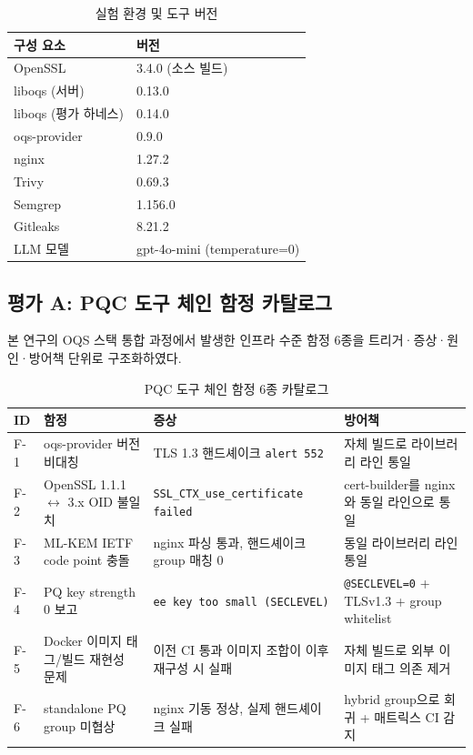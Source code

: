 \begin{table}[htbp]
\centering
\renewcommand{\arraystretch}{1.3}
\caption{실험 환경 및 도구 버전}
\label{tab:env}
\begin{tabular}{ll}
\toprule
구성 요소 & 버전 \\
\midrule
OpenSSL & 3.4.0 (소스 빌드) \\
liboqs (서버) & 0.13.0 \\
liboqs (평가 하네스) & 0.14.0 \\
oqs-provider & 0.9.0 \\
nginx & 1.27.2 \\
Trivy & 0.69.3 \\
Semgrep & 1.156.0 \\
Gitleaks & 8.21.2 \\
LLM 모델 & gpt-4o-mini (temperature=0) \\
\bottomrule
\end{tabular}
\end{table}

\subsection{평가 A: PQC 도구 체인 함정 카탈로그}

본 연구의 OQS 스택 통합 과정에서 발생한 인프라 수준 함정 6종을 트리거·증상·원인·방어책 단위로 구조화하였다.

\begin{table}[htbp]
\centering
\renewcommand{\arraystretch}{1.3}
\caption{PQC 도구 체인 함정 6종 카탈로그}
\label{tab:trap_catalog}
\begin{tabular}{p{0.5cm}p{3cm}p{4.5cm}p{4cm}}
\toprule
ID & 함정 & 증상 & 방어책 \\
\midrule
F-1 & oqs-provider 버전 비대칭 & TLS 1.3 핸드셰이크 \texttt{alert 552} & 자체 빌드로 라이브러리 라인 통일 \\
F-2 & OpenSSL 1.1.1 $\leftrightarrow$ 3.x OID 불일치 & \texttt{SSL\_CTX\_use\_certificate failed} & cert-builder를 nginx와 동일 라인으로 통일 \\
F-3 & ML-KEM IETF code point 충돌 & nginx 파싱 통과, 핸드셰이크 group 매칭 0 & 동일 라이브러리 라인 통일 \\
F-4 & PQ key strength 0 보고 & \texttt{ee key too small (SECLEVEL)} & \texttt{@SECLEVEL=0} + TLSv1.3 + group whitelist \\
F-5 & Docker 이미지 태그/빌드 재현성 문제 & 이전 CI 통과 이미지 조합이 이후 재구성 시 실패 & 자체 빌드로 외부 이미지 태그 의존 제거 \\
F-6 & standalone PQ group 미협상 & nginx 기동 정상, 실제 핸드셰이크 실패 & hybrid group으로 회귀 + 매트릭스 CI 감지 \\
\bottomrule
\end{tabular}
\end{table}

